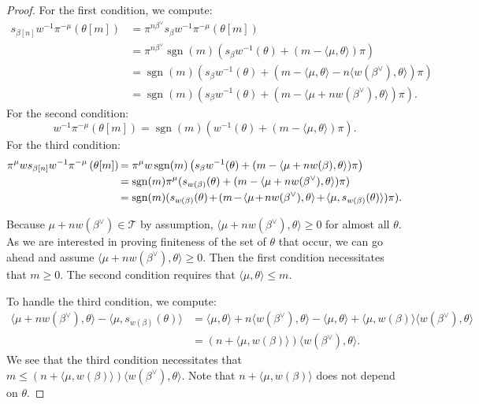 \documentclass[ALCO,ThmDefs,Unicode]{cedram}
\DeclareMathOperator{\sgn}{sgn}
\newcommand{\betacheck}{\beta^\vee}
\newcommand{\cT}{\mathcal{T}}
\newcommand{\TitsCone}{\cT}
\newcommand*{\Mk}{\mkern -2mu}
\begin{document}
\begin{proof}
For the first condition, we compute:
\begin{align*}
s_{\beta[n]} w^{-1} \pi^{-\mu} \left(\theta[m] \right) &=
\pi^{n \betacheck} s_\beta w^{-1} \pi^{-\mu} \left(\theta[m] \right) \\
&= \pi^{n \betacheck} \sgn(m) \left(s_\beta w^{-1}(\theta) + (m - \langle \mu, \theta \rangle) \pi \right)\\
&=
\sgn(m) \left(s_\beta w^{-1}(\theta) + (m - \langle \mu, \theta \rangle - n \langle w(\betacheck),\theta \rangle) \pi \right)\\
&=
\sgn(m) \left(s_\beta w^{-1}(\theta) + (m - \langle \mu + n w(\betacheck), \theta \rangle) \pi \right).
\end{align*}
For the second condition:
\begin{equation*}
w^{-1} \pi^{-\mu} \left(\theta[m] \right) =
\sgn(m) (w^{-1}(\theta) + (m - \langle \mu, \theta \rangle) \pi).
\end{equation*}
For the third condition:
\begin{align*}
\pi^{\mu} w s_{\beta[n]} w^{-1} \pi^{-\mu} \left(\theta[m] \right) \Mk&=
\pi^{\mu} w
\sgn(m) \left(s_\beta w^{-1}(\theta) + (m - \langle \mu + n w(\beta), \theta \rangle) \pi \right)\\
&= \sgn(m) \pi^{\mu} (s_{w(\beta)}(\theta) + (m - \langle \mu + n w(\betacheck), \theta \rangle) \pi)\\
&= \sgn(m) (s_{w(\beta)}(\theta) \Mk + \Mk (m \Mk - \Mk\langle \mu \Mk+\Mk n w(\betacheck), \theta \rangle \Mk+\Mk \langle \mu, s_{w(\beta)}(\theta)\rangle) \pi).
\end{align*}

Because $\mu + n w(\betacheck) \in \TitsCone$ by assumption, $\langle \mu + n w(\betacheck), \theta \rangle \geq 0$ for almost all $\theta$. As we are interested in proving finiteness of the set of $\theta$ that occur, we can go ahead and assume $\langle \mu + n w(\betacheck), \theta \rangle \geq 0$. Then the first condition necessitates that $m \geq 0$. The second condition requires that $\langle \mu, \theta \rangle \leq m$.

To handle the third condition, we compute:
\begin{align*}
\langle \mu + n w(\betacheck), \theta \rangle - \langle \mu, s_{w(\beta)}(\theta)\rangle &=
\langle \mu, \theta \rangle + n \langle w(\betacheck), \theta \rangle - \langle \mu, \theta \rangle + \langle \mu, w(\beta) \rangle \langle w(\betacheck), \theta \rangle\\
&= (n + \langle \mu, w(\beta) \rangle) \langle w(\betacheck), \theta \rangle.
\end{align*}
We see that the third condition necessitates that $m \leq (n + \langle \mu, w(\beta) \rangle) \langle w(\betacheck), \theta \rangle$. Note that $n + \langle \mu, w(\beta) \rangle $ does not depend on $\theta$.


\end{proof}
\end{document}

